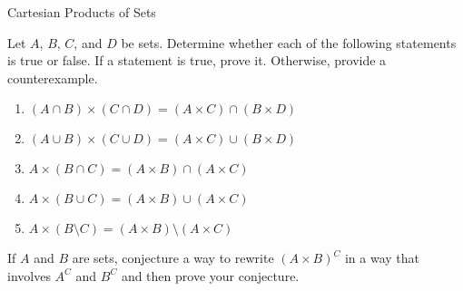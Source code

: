 \begin{section}{Cartesian Products of Sets}
\begin{problem}
Let $A$, $B$, $C$, and $D$ be sets.  Determine whether each of the following statements is true or false.  If a statement is true, prove it.  Otherwise, provide a counterexample.
\begin{enumerate}[label=\textrm{(\alph*)}]
\item $(A\cap B)\times (C\cap D)=(A\times C)\cap (B\times D)$
\item $(A\cup B)\times (C\cup D)=(A\times C)\cup (B\times D)$
\item $A\times (B\cap C)=(A\times B)\cap (A\times C)$
\item $A\times (B\cup C)=(A\times B)\cup (A\times C)$
\item $A\times (B\setminus C) = (A\times B)\setminus (A\times C)$
\end{enumerate}
\end{problem}

\begin{problem}
If $A$ and $B$ are sets, conjecture a way to rewrite $(A\times B)^C$ in a way that involves $A^C$ and $B^C$ and then prove your conjecture.
\end{problem}

\end{section}